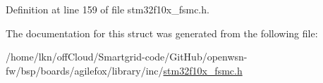 Definition at line 159 of file stm32f10x\+\_\+fsmc.\+h.



The documentation for this struct was generated from the following file\+:\begin{DoxyCompactItemize}
\item 
/home/lkn/off\+Cloud/\+Smartgrid-\/code/\+Git\+Hub/openwsn-\/fw/bsp/boards/agilefox/library/inc/\hyperlink{agilefox_2library_2inc_2stm32f10x__fsmc_8h}{stm32f10x\+\_\+fsmc.\+h}\end{DoxyCompactItemize}
